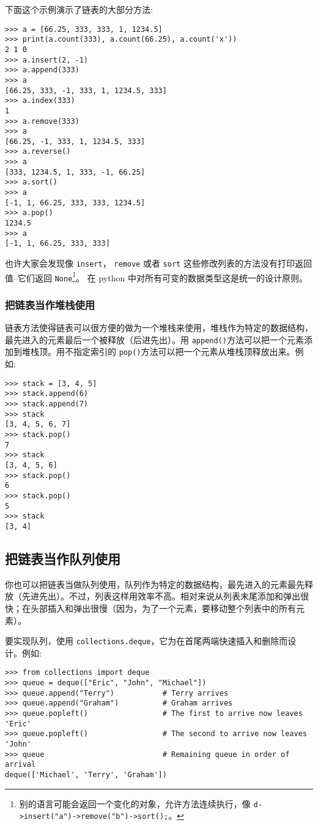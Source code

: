 下面这个示例演示了链表的大部分方法:
\begin{lstlisting}
>>> a = [66.25, 333, 333, 1, 1234.5]
>>> print(a.count(333), a.count(66.25), a.count('x'))
2 1 0
>>> a.insert(2, -1)
>>> a.append(333)
>>> a
[66.25, 333, -1, 333, 1, 1234.5, 333]
>>> a.index(333)
1
>>> a.remove(333)
>>> a
[66.25, -1, 333, 1, 1234.5, 333]
>>> a.reverse()
>>> a
[333, 1234.5, 1, 333, -1, 66.25]
>>> a.sort()
>>> a
[-1, 1, 66.25, 333, 333, 1234.5]
>>> a.pop()
1234.5
>>> a
[-1, 1, 66.25, 333, 333]
\end{lstlisting}
也许大家会发现像 \texttt{insert}， \texttt{remove} 或者 \texttt{sort} 这些修改列表的方法没有打印返回值–它们返回 \texttt{None}\footnote{别的语言可能会返回一个变化的对象，允许方法连续执行，像 \texttt{d->insert("a")->remove("b")->sort();}。}。 在 python 中对所有可变的数据类型这是统一的设计原则。
\subsubsection{把链表当作堆栈使用}
链表方法使得链表可以很方便的做为一个堆栈来使用，堆栈作为特定的数据结构，最先进入的元素最后一个被释放（后进先出）。用 \texttt{append()}方法可以把一个元素添加到堆栈顶。用不指定索引的 \texttt{pop()}方法可以把一个元素从堆栈顶释放出来。例如:
\begin{lstlisting}
>>> stack = [3, 4, 5]
>>> stack.append(6)
>>> stack.append(7)
>>> stack
[3, 4, 5, 6, 7]
>>> stack.pop()
7
>>> stack
[3, 4, 5, 6]
>>> stack.pop()
6
>>> stack.pop()
5
>>> stack
[3, 4]
\end{lstlisting}
\subsection{把链表当作队列使用}
你也可以把链表当做队列使用，队列作为特定的数据结构，最先进入的元素最先释放（先进先出）。不过，列表这样用效率不高。相对来说从列表末尾添加和弹出很快；在头部插入和弹出很慢（因为，为了一个元素，要移动整个列表中的所有元素）。

要实现队列，使用 \texttt{collections.deque}，它为在首尾两端快速插入和删除而设计。例如:
\begin{lstlisting}
>>> from collections import deque
>>> queue = deque(["Eric", "John", "Michael"])
>>> queue.append("Terry")           # Terry arrives
>>> queue.append("Graham")          # Graham arrives
>>> queue.popleft()                 # The first to arrive now leaves
'Eric'
>>> queue.popleft()                 # The second to arrive now leaves
'John'
>>> queue                           # Remaining queue in order of arrival
deque(['Michael', 'Terry', 'Graham'])
\end{lstlisting}
